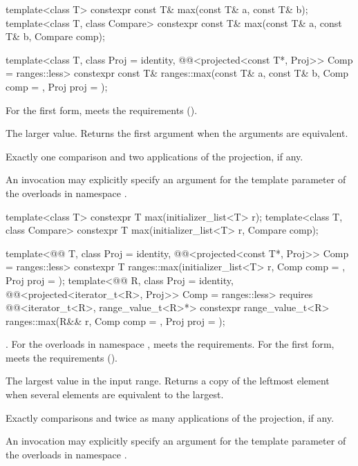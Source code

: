 %
\begin{itemdecl}
template<class T>
  constexpr const T& max(const T& a, const T& b);
template<class T, class Compare>
  constexpr const T& max(const T& a, const T& b, Compare comp);

template<class T, class Proj = identity,
         @@<projected<const T*, Proj>> Comp = ranges::less>
  constexpr const T& ranges::max(const T& a, const T& b, Comp comp = {}, Proj proj = {});
\end{itemdecl}

\begin{itemdescr}
\pnum
\expects
For the first form,  meets the
 requirements ().

\pnum
\returns
The larger value.
Returns the first argument when the arguments are equivalent.

\pnum
\complexity
Exactly one comparison and two applications of the projection, if any.

\pnum
\remarks
An invocation may explicitly specify
an argument for the template parameter 
of the overloads in namespace .
\end{itemdescr}

%
\begin{itemdecl}
template<class T>
  constexpr T max(initializer_list<T> r);
template<class T, class Compare>
  constexpr T max(initializer_list<T> r, Compare comp);

template<@@ T, class Proj = identity,
         @@<projected<const T*, Proj>> Comp = ranges::less>
  constexpr T ranges::max(initializer_list<T> r, Comp comp = {}, Proj proj = {});
template<@@ R, class Proj = identity,
         @@<projected<iterator_t<R>, Proj>> Comp = ranges::less>
  requires @@<iterator_t<R>, range_value_t<R>*>
  constexpr range_value_t<R>
    ranges::max(R&& r, Comp comp = {}, Proj proj = {});
\end{itemdecl}

\begin{itemdescr}
\pnum
\expects
{}.
For the overloads in namespace ,
 meets the  requirements.
For the first form,  meets the 
requirements ().

\pnum
\returns
The largest value in the input range.
Returns a copy of the leftmost element
when several elements are equivalent to the largest.

\pnum
\complexity
Exactly  comparisons
and twice as many applications of the projection, if any.

\pnum
\remarks
An invocation may explicitly specify
an argument for the template parameter 
of the overloads in namespace .
\end{itemdescr}

